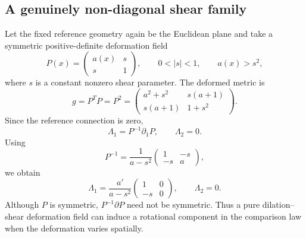 \documentclass[12pt]{amsart}
\theoremstyle{definition}
\theoremstyle{remark}
\begin{document}
\subsection{A genuinely non-diagonal shear family}

Let the fixed reference geometry again be the Euclidean plane and take a symmetric positive-definite deformation field
\begin{equation}\label{eq:P_nondiag_v2}
 P(x)=\begin{pmatrix} a(x)&s\\ s&1\end{pmatrix},
 \qquad 0<|s|<1,
 \qquad a(x)>s^2,
\end{equation}
where $s$ is a constant nonzero shear parameter.  The deformed metric is
\begin{equation}
 g=P^TP=P^2
 =\begin{pmatrix} a^2+s^2&s(a+1)\\ s(a+1)&1+s^2\end{pmatrix} .
\end{equation}
Since the reference connection is zero,
\begin{equation}
 \Lambda_1=P^{-1}\partial_1P,
 \qquad
 \Lambda_2=0 .
\end{equation}
Using
\begin{equation}
 P^{-1}=\frac{1}{a-s^2}\begin{pmatrix}1&-s\\-s&a\end{pmatrix},
\end{equation}
we obtain
\begin{equation}\label{eq:Lambda_nondiag_v2}
 \Lambda_1=\frac{a'}{a-s^2}\begin{pmatrix}1&0\\-s&0\end{pmatrix},
 \qquad
 \Lambda_2=0 .
\end{equation}
Although $P$ is symmetric, $P^{-1}\partial P$ need not be symmetric.  Thus a pure dilation--shear deformation field can induce a rotational component in the comparison law when the deformation varies spatially.
\end{document}
